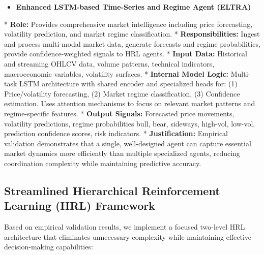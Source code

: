 \documentclass[11pt]{article}
\begin{document}
\begin{itemize}
\item   \textbf{Enhanced LSTM-based Time-Series and Regime Agent (ELTRA)}
\end{itemize}
    *   \textbf{Role:} Provides comprehensive market intelligence including price forecasting, volatility prediction, and market regime classification.
    *   \textbf{Responsibilities:} Ingest and process multi-modal market data, generate forecasts and regime probabilities, provide confidence-weighted signals to HRL agents.
    *   \textbf{Input Data:} Historical and streaming OHLCV data, volume patterns, technical indicators, macroeconomic variables, volatility surfaces.
    *   \textbf{Internal Model Logic:} Multi-task LSTM architecture with shared encoder and specialized heads for: (1) Price/volatility forecasting, (2) Market regime classification, (3) Confidence estimation. Uses attention mechanisms to focus on relevant market patterns and regime-specific features.
    *   \textbf{Output Signals:} Forecasted price movements, volatility predictions, regime probabilities {bull, bear, sideways, high-vol, low-vol}, prediction confidence scores, risk indicators.
    *   \textbf{Justification:} Empirical validation demonstrates that a single, well-designed agent can capture essential market dynamics more efficiently than multiple specialized agents, reducing coordination complexity while maintaining predictive accuracy.

\subsection{Streamlined Hierarchical Reinforcement Learning (HRL) Framework}

Based on empirical validation results, we implement a focused two-level HRL architecture that eliminates unnecessary complexity while maintaining effective decision-making capabilities:
\end{document}
